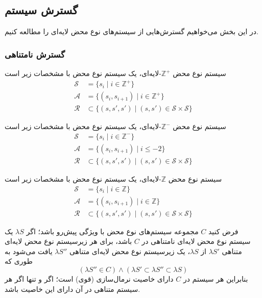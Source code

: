 \subsection*{گسترش سیستم}

در این بخش می‌خواهیم گسترش‌هایی از سیستم‌های نوع محض لایه‌ای را مطالعه کنیم.

\subsubsection{گسترش نامتناهی}

\begin{defn}
سیستم نوع محض $\mathbb{Z}^+$-لایه‌ای،
یک سیستم نوع محض با مشخصات زیر است
\begin{align*}
\mathcal{S} &= \{ s_i \mid i \in \mathbb{Z}^+ \}\\
\mathcal{A} &= \{ (s_i,s_{i+1}) \mid i \in \mathbb{Z}^+ \}\\
\mathcal{R} &\subset \{ (s,s',s') \mid (s,s') \in \mathcal{S} \times \mathcal{S} \}
\end{align*}
\end{defn}

\begin{defn}
سیستم نوع محض $\mathbb{Z}^-$-لایه‌ای،
یک سیستم نوع محض با مشخصات زیر است
\begin{align*}
\mathcal{S} &= \{ s_i \mid i \in \mathbb{Z}^- \}\\
\mathcal{A} &= \{ (s_i,s_{i+1}) \mid i \leq -2 \}\\
\mathcal{R} &\subset \{ (s,s',s') \mid (s,s') \in \mathcal{S} \times \mathcal{S} \}
\end{align*}
\end{defn}

\begin{defn}
سیستم نوع محض $\mathbb{Z}$-لایه‌ای،
یک سیستم نوع محض با مشخصات زیر است
\begin{align*}
\mathcal{S} &= \{ s_i \mid i \in \mathbb{Z} \}\\
\mathcal{A} &= \{ (s_i,s_{i+1}) \mid i \in \mathbb{Z} \}\\
\mathcal{R} &\subset \{ (s,s',s') \mid (s,s') \in \mathcal{S} \times \mathcal{S} \}
\end{align*}
\end{defn}

\begin{prop}
فرض کنید
$C$
مجموعه سیستم‌های نوع محض با ویژگی پیش‌رو باشد؛ اگر
$\lambda S$
یک سیستم نوع محض لایه‌ای نامتناهی در
$C$
باشد، برای هر زیرسیستم نوع محض لایه‌ای متناهی
$\lambda S'$
از
$\lambda S$،
یک زیرسیستم نوع محض لایه‌ای متناهی
$\lambda S''$
یافت می‌شود به طوری که
\begin{equation*}
(\lambda S'' \in C) \land (\lambda S' \subset \lambda S'' \subset \lambda S)
\end{equation*}
بنابراین هر سیستم در
$C$
دارای خاصیت نرمال‌سازی (قوی) است؛ اگر و تنها اگر هر سیستم متناهی در آن دارای این خاصیت باشد.
\end{prop}

